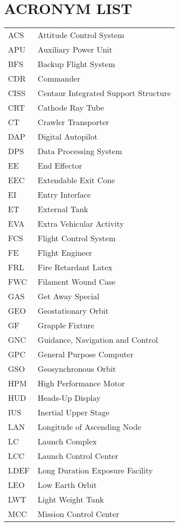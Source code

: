 \documentclass[Space_Shuttle_Vessel_Manual.tex]{subfiles}
\begin{document}
\section{ACRONYM LIST}
\label{sec:acronym-list}
\noindent
\begin{longtable}{l l }
ACS & Attitude Control System\\
APU & Auxiliary Power Unit\\
BFS & Backup Flight System\\
CDR & Commander\\
CISS & Centaur Integrated Support Structure\\
CRT & Cathode Ray Tube\\
CT & Crawler Transporter\\
DAP & Digital Autopilot\\
DPS & Data Processing System\\
EE & End Effector\\
EEC & Extendable Exit Cone\\
EI & Entry Interface\\
ET & External Tank\\
EVA & Extra Vehicular Activity\\
FCS & Flight Control System\\
FE & Flight Engineer\\
FRL & Fire Retardant Latex\\
FWC & Filament Wound Case\\
GAS & Get Away Special\\
GEO & Geostationary Orbit\\
GF & Grapple Fixture\\
GNC & Guidance, Navigation and Control\\
GPC & General Purpose Computer\\
GSO & Geosynchronous Orbit\\
HPM & High Performance Motor\\
HUD & Heads-Up Display\\
IUS & Inertial Upper Stage\\
LAN & Longitude of Ascending Node\\
LC & Launch Complex\\
LCC & Launch Control Center\\
LDEF & Long Duration Exposure Facility\\
LEO & Low Earth Orbit\\
LWT & Light Weight Tank\\
MCC & Mission Control Center\\

\end{longtable}
\end{document}

